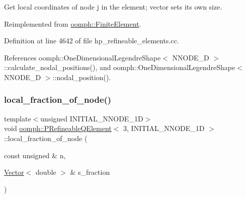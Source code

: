 Get local coordinates of node j in the element; vector sets its own size. 



Reimplemented from \hyperlink{classoomph_1_1FiniteElement_a22bc4ee35e4f948d8d7fba18c7b4f4c4}{oomph\+::\+Finite\+Element}.



Definition at line 4642 of file hp\+\_\+refineable\+\_\+elements.\+cc.



References oomph\+::\+One\+Dimensional\+Legendre\+Shape$<$ N\+N\+O\+D\+E\+\_\+D $>$\+::calculate\+\_\+nodal\+\_\+positions(), and oomph\+::\+One\+Dimensional\+Legendre\+Shape$<$ N\+N\+O\+D\+E\+\_\+D $>$\+::nodal\+\_\+position().

\mbox{\label{classoomph_1_1PRefineableQElement_3_013_00_01INITIAL__NNODE__1D_01_4_a01c4b27c53fcf94e34985b17ab7c309d}} 
\subsubsection{\texorpdfstring{local\+\_\+fraction\+\_\+of\+\_\+node()}{local\_fraction\_of\_node()}}
{\footnotesize\ttfamily template$<$unsigned I\+N\+I\+T\+I\+A\+L\+\_\+\+N\+N\+O\+D\+E\+\_\+1D$>$ \\
void \hyperlink{classoomph_1_1PRefineableQElement}{oomph\+::\+P\+Refineable\+Q\+Element}$<$ 3, I\+N\+I\+T\+I\+A\+L\+\_\+\+N\+N\+O\+D\+E\+\_\+1D $>$\+::local\+\_\+fraction\+\_\+of\+\_\+node (\begin{DoxyParamCaption}\item[{const unsigned \&}]{n,  }\item[{\hyperlink{classoomph_1_1Vector}{Vector}$<$ double $>$ \&}]{s\+\_\+fraction }\end{DoxyParamCaption})\hspace{0.3cm}{\ttfamily [virtual]}}



